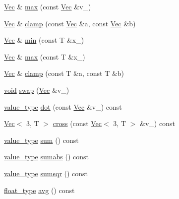 \begin{DoxyCompactItemize}
\hyperlink{classtrimesh_1_1Vec}{Vec} \& \hyperlink{classtrimesh_1_1Vec_aa59364715c73bbd0385fcf5c8e195faf}{max} (const \hyperlink{classtrimesh_1_1Vec}{Vec} \&v\+\_\+)
\item 
\hyperlink{classtrimesh_1_1Vec}{Vec} \& \hyperlink{classtrimesh_1_1Vec_a34c4f6234606c33fa5f4e827de362dc2}{clamp} (const \hyperlink{classtrimesh_1_1Vec}{Vec} \&a, const \hyperlink{classtrimesh_1_1Vec}{Vec} \&b)
\item 
\hyperlink{classtrimesh_1_1Vec}{Vec} \& \hyperlink{classtrimesh_1_1Vec_a7dcd7ab1a385c55e489f4798ad98bc01}{min} (const T \&x\+\_\+)
\item 
\hyperlink{classtrimesh_1_1Vec}{Vec} \& \hyperlink{classtrimesh_1_1Vec_a71c0b380591e02c8571bdac24b246ae2}{max} (const T \&x\+\_\+)
\item 
\hyperlink{classtrimesh_1_1Vec}{Vec} \& \hyperlink{classtrimesh_1_1Vec_a703f0f41eb50298f33bf85e768eccbbe}{clamp} (const T \&a, const T \&b)
\item 
\hyperlink{namespacetrimesh_a784ddfd979e1c579bda795a8edfc3f43}{void} \hyperlink{classtrimesh_1_1Vec_aeabbb3531ef4be7bf41dd3c3628f7a54}{swap} (\hyperlink{classtrimesh_1_1Vec}{Vec} \&v\+\_\+)
\item 
\hyperlink{classtrimesh_1_1Vec_a10a59253996e42d67c713f37592669df}{value\+\_\+type} \hyperlink{classtrimesh_1_1Vec_a5f6c502820bd708b213c6b2d25c9a8a5}{dot} (const \hyperlink{classtrimesh_1_1Vec}{Vec} \&v\+\_\+) const
\item 
\hyperlink{classtrimesh_1_1Vec}{Vec}$<$ 3, T $>$ \hyperlink{classtrimesh_1_1Vec_ab7b5a993ec53b35a31827825bcb4cc60}{cross} (const \hyperlink{classtrimesh_1_1Vec}{Vec}$<$ 3, T $>$ \&v\+\_\+) const
\item 
\hyperlink{classtrimesh_1_1Vec_a10a59253996e42d67c713f37592669df}{value\+\_\+type} \hyperlink{classtrimesh_1_1Vec_a067ed6c05d8df1235d9485d7c000b5ca}{sum} () const
\item 
\hyperlink{classtrimesh_1_1Vec_a10a59253996e42d67c713f37592669df}{value\+\_\+type} \hyperlink{classtrimesh_1_1Vec_a8c4651f7c8cee19d66aa05d7f1b5518f}{sumabs} () const
\item 
\hyperlink{classtrimesh_1_1Vec_a10a59253996e42d67c713f37592669df}{value\+\_\+type} \hyperlink{classtrimesh_1_1Vec_a5ea80c490c3c14e11580be1931a77f0b}{sumsqr} () const
\item 
\hyperlink{classtrimesh_1_1Vec_a2593716457a143008832235a3e4a9155}{float\+\_\+type} \hyperlink{classtrimesh_1_1Vec_a2793173421d466ffd26076f573de459c}{avg} () const
\item 

\end{DoxyCompactItemize}
